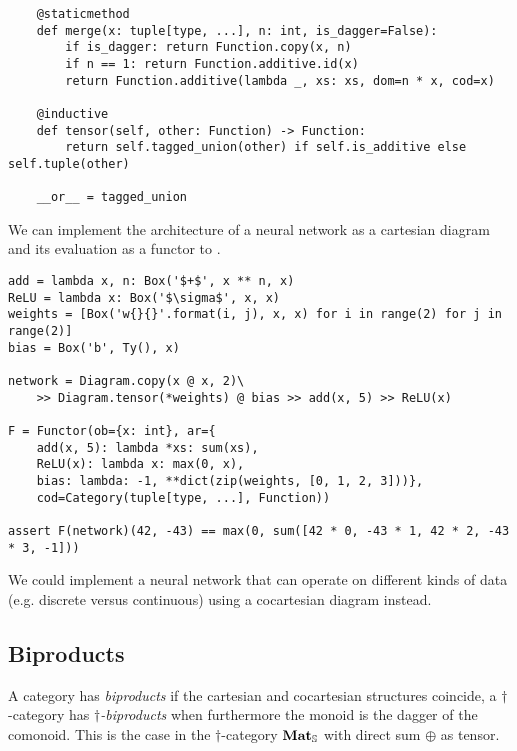 \begin{python}
\begin{verbatim}
    @staticmethod
    def merge(x: tuple[type, ...], n: int, is_dagger=False):
        if is_dagger: return Function.copy(x, n)
        if n == 1: return Function.additive.id(x)
        return Function.additive(lambda _, xs: xs, dom=n * x, cod=x)

    @inductive
    def tensor(self, other: Function) -> Function:
        return self.tagged_union(other) if self.is_additive else self.tuple(other)

    __or__ = tagged_union
\end{verbatim}
\end{python}

\begin{example}
We can implement the architecture of a neural network as a cartesian diagram and its evaluation as a functor to .

\begin{verbatim}
add = lambda x, n: Box('$+$', x ** n, x)
ReLU = lambda x: Box('$\sigma$', x, x)
weights = [Box('w{}{}'.format(i, j), x, x) for i in range(2) for j in range(2)]
bias = Box('b', Ty(), x)

network = Diagram.copy(x @ x, 2)\
    >> Diagram.tensor(*weights) @ bias >> add(x, 5) >> ReLU(x)

F = Functor(ob={x: int}, ar={
    add(x, 5): lambda *xs: sum(xs),
    ReLU(x): lambda x: max(0, x),
    bias: lambda: -1, **dict(zip(weights, [0, 1, 2, 3]))},
    cod=Category(tuple[type, ...], Function))

assert F(network)(42, -43) == max(0, sum([42 * 0, -43 * 1, 42 * 2, -43 * 3, -1]))
\end{verbatim}

We could implement a neural network that can operate on different kinds of data (e.g. discrete versus continuous) using a cocartesian diagram instead.
\end{example}

\subsection{Biproducts}\label{subsection:biproducts}

A category has \emph{biproducts} if the cartesian and cocartesian structures coincide,
a $\dagger$-category has \emph{$\dagger$-biproducts} when furthermore the monoid is the dagger of the comonoid.
This is the case in the $\dagger$-category $\mathbf{Mat}_\S$ with direct sum $\oplus$ as tensor.

